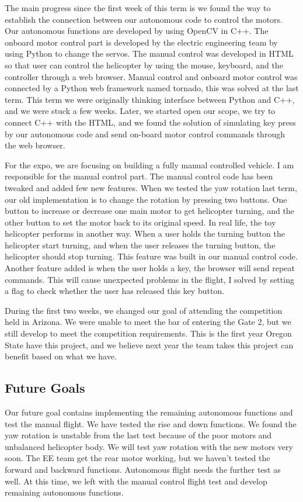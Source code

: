 \documentclass[onecolumn, draftclsnofoot,10pt, compsoc]{IEEEtran}
\begin{document}
The main progress since the first week of this term is we found the way to establish the connection between our autonomous code to control the motors. Our autonomous functions are developed by using OpenCV in C++. The onboard motor control part is developed by the electric engineering team by using Python to change the servos. The manual control was developed in HTML so that user can control the helicopter by using the mouse, keyboard, and the controller through a web browser. Manual control and onboard motor control was connected by a Python web framework named tornado, this was solved at the last term. This term we were originally thinking interface between Python and C++, and we were stuck a few weeks. Later, we started open our scope, we try to connect C++ with the HTML, and we found the solution of simulating key press by our autonomous code and send on-board motor control commands through the web browser.

For the expo, we are focusing on building a fully manual controlled vehicle. I am responsible for the manual control part. The manual control code has been tweaked and added few new features. When we tested the yaw rotation last term, our old implementation is to change the rotation by pressing two buttons. One button to increase or decrease one main motor to get helicopter turning, and the other button to set the motor back to its original speed. In real life, the toy helicopter performs in another way. When a user holds the turning button the helicopter start turning, and when the user releases the turning button, the helicopter should stop turning. This feature was built in our manual control code. Another feature added is when the user holds a key, the browser will send repeat commands. This will cause unexpected problems in the flight, I solved by setting a flag to check whether the user has released this key button.

During the first two weeks, we changed our goal of attending the competition held in Arizona. We were unable to meet the bar of entering the Gate 2, but we still develop to meet the competition requirements. This is the first year Oregon State have this project, and we believe next year the team takes this project can benefit based on what we have.

\subsection{Future Goals}

Our future goal contains implementing the remaining autonomous functions and test the manual flight. We have tested the rise and down functions. We found the yaw rotation is unstable from the last test because of the poor motors and unbalanced helicopter body. We will test yaw rotation with the new motors very soon. The EE team get the rear motor working, but we haven’t tested the forward and backward functions. Autonomous flight needs the further test as well. At this time, we left with the manual control flight test and develop remaining autonomous functions.
\end{document}
